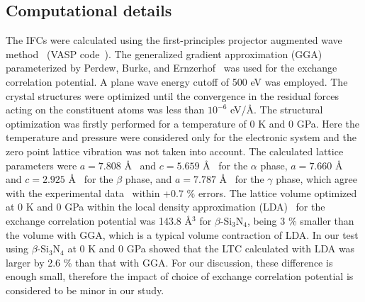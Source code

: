 \documentclass[twocolumn,amsmath,amssymb,a4paper,prb,superscriptaddress,floatfix]{revtex4-1}
\begin{document}
\subsection{Computational details}
The IFCs were calculated using the first-principles projector augmented
wave method~\cite{paw} (VASP code~\cite{vasp-1996,vasp-1995, vasp-1999}). The generalized
gradient approximation (GGA) parameterized by Perdew, Burke, and
Ernzerhof~\cite{pbe} was used for the exchange correlation potential. A plane
wave energy cutoff of 500 eV was employed. The crystal structures were
optimized until the convergence in the residual forces acting on the
constituent atoms was less than $10^{-6}$ eV/\AA. The structural
optimization was firstly performed for a temperature of 0 K and 0
GPa. Here the temperature and pressure were considered only for the
electronic system and the zero point lattice vibration was not taken
into account. The calculated lattice parameters were $a=7.808$ \AA~ and
$c=5.659$ \AA~ for the $\alpha$ phase, $a=7.660$ \AA~ and $c=2.925$ \AA~%
for the $\beta$ phase, and $a=7.787$ \AA~ for the $\gamma$ phase, which
agree with the experimental data~\cite{yashima,boulay,paszkowicz-gSi3N4} within +0.7 \% errors. The
lattice volume optimized at 0 K and 0 GPa within the local density
approximation (LDA)~\cite{lda} for the exchange correlation potential was 143.8
\AA$^3$ for $\beta$-Si$_3$N$_4$, being 3 \% smaller than the volume with
GGA, which is a typical volume contraction of LDA. In our test using
$\beta$-Si$_3$N$_4$ at 0 K and 0 GPa showed that the LTC calculated with
LDA was larger by 2.6 \% than that with GGA. For our discussion, these
difference is enough small, therefore the impact of choice of exchange
correlation potential is considered to be minor in our study.
\end{document}
